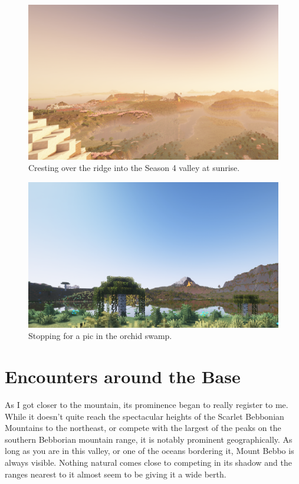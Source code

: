 \begin{figure}[H]
    \centering
    \includegraphics[width=1.1\textwidth]{Cresting over the ridge into the Season 4 Valley Sunrise.png}
    \caption{Cresting over the ridge into the Season 4 valley at sunrise.}
    
\end{figure}

\begin{figure}[H]
    \centering
    \includegraphics[width=1\linewidth]{Isalnd down the ridge.png}
    \caption{Stopping for a pic in the orchid swamp.}
\end{figure}

\section{Encounters around the Base}

\large
As I got closer to the mountain, its prominence began to really register to me. While it doesn't quite reach the spectacular heights of the Scarlet Bebbonian Mountains to the northeast, or compete with the largest of the peaks on the southern Bebborian mountain range, it is notably prominent geographically. As long as you are in this valley, or one of the oceans bordering it, Mount Bebbo is always visible. Nothing natural comes close to competing in its shadow and the ranges nearest to it almost seem to be giving it a wide berth.

